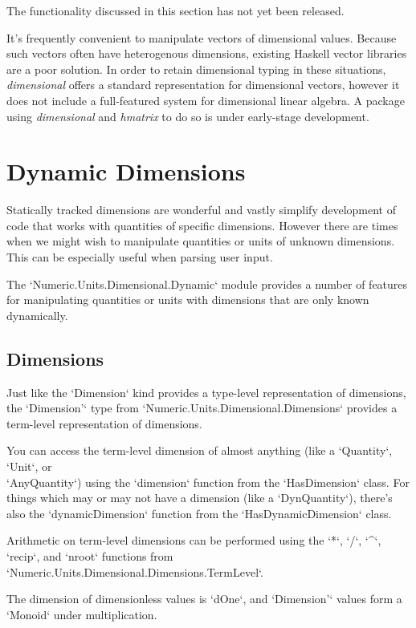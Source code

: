 \documentclass[11pt]{report}
\newcommand{\packagename}[1]{\textit{#1}}
\newcommand{\thispackage}{\packagename{dimensional}}
\newcommand{\prerelease}{\begin{framed}
The functionality discussed in this section has not yet been released.
\end{framed}}
\begin{document}
\prerelease{}

It's frequently convenient to manipulate vectors of dimensional values. Because such vectors often have heterogenous
dimensions, existing Haskell vector libraries are a poor solution. In order to retain dimensional typing in these situations,
\thispackage{} offers a standard representation for dimensional vectors, however it does not include a full-featured system for
dimensional linear algebra. A package using \thispackage{} and \packagename{hmatrix} to do so is under early-stage development.





\chapter{Dynamic Dimensions}

Statically tracked dimensions are wonderful and vastly simplify development of code that works with quantities of specific
dimensions. However there are times when we might wish to manipulate quantities or units of unknown dimensions. This can be
especially useful when parsing user input.

The `Numeric.Units.Dimensional.Dynamic` module provides a number of features for manipulating quantities or units with dimensions that are only
known dynamically.

\section{Dimensions}

Just like the `Dimension` kind provides a type-level representation of dimensions, the `Dimension'` type from `Numeric.Units.Dimensional.Dimensions`
provides a term-level representation of dimensions.

You can access the term-level dimension of almost anything (like a `Quantity`, `Unit`, or \\
`AnyQuantity`) using the `dimension` function from the `HasDimension` class. For things
which may or may not have a dimension (like a `DynQuantity`), there's also the `dynamicDimension`
function from the `HasDynamicDimension` class.

Arithmetic on term-level dimensions can be performed using the `*`, `/`, `^`, `recip`, and `nroot` functions from `Numeric.Units.Dimensional.Dimensions.TermLevel`.

The dimension of dimensionless values is `dOne`, and `Dimension'` values form a `Monoid` under multiplication.
\end{document}

